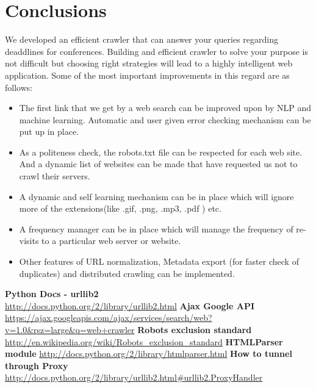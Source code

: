 \documentclass[]{article}
\begin{document}
\section{Conclusions}
We developed an efficient crawler that can answer your queries regarding deaddlines for conferences. Building and efficient crawler to solve your purpose is not difficult but choosing right strategies will lead to a highly intelligent web application. Some of the most important improvements in this regard are as follows:
\begin{itemize}
	\item The first link that we get by a web search can be improved upon by NLP and machine learning. Automatic and user given error 		checking mechanism can be put up in place.
	\item As a politeness check, the robots.txt \cite{robot} file can be respected for each web site. And a dynamic list of websites can be made that 		have requested us not to crawl their servers.
	\item A dynamic and self learning mechanism can be in place which will ignore more of the extensions(like .gif, .png, .mp3, .pdf ) etc.
	\item A frequency manager can be in place which will manage the frequency of re-visits to a particular web server or website.
	\item Other features of URL normalization, Metadata export (for faster check of duplicates) and distributed crawling can be 		implemented.
\end{itemize}

\begin{thebibliography}{9}
	\textbf{Python Docs - urllib2}\\	\url{http://docs.python.org/2/library/urllib2.html}
	\textbf{Ajax Google API}		\url{https://ajax.googleapis.com/ajax/services/search/web?v=1.0&rsz=large&q=web+crawler}
	\textbf{Robots exclusion standard}	\url{http://en.wikipedia.org/wiki/Robots_exclusion_standard}
	\textbf{HTMLParser module}		\url{http://docs.python.org/2/library/htmlparser.html}
	\textbf{How to tunnel through Proxy}	\url{http://docs.python.org/2/library/urllib2.html#urllib2.ProxyHandler}
\end{thebibliography}
\end{document}
